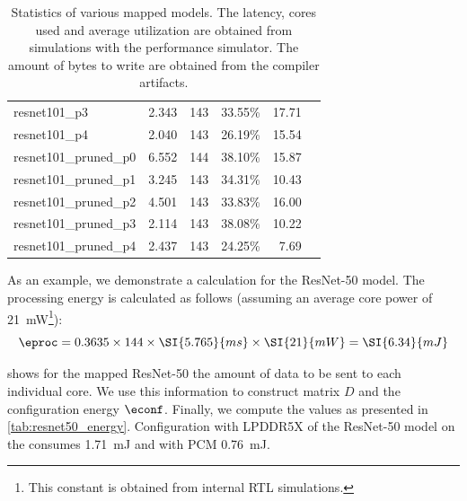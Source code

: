 \begin{table}[hbtp]
\begin{tabular}{@{}lrrrrr@{}}
resnet101\_p3           & 2.343                                                           & 143            & 33.55\%            & 17.71                                                             \\
resnet101\_p4           & 2.040                                                           & 143            & 26.19\%            & 15.54                                                             \\
resnet101\_pruned\_p0   & 6.552                                                           & 144            & 38.10\%            & 15.87                                                             \\
resnet101\_pruned\_p1   & 3.245                                                           & 143            & 34.31\%            & 10.43                                                             \\
resnet101\_pruned\_p2   & 4.501                                                           & 143            & 33.83\%            & 16.00                                                             \\
resnet101\_pruned\_p3   & 2.114                                                           & 143            & 38.08\%            & 10.22                                                             \\
resnet101\_pruned\_p4   & 2.437                                                           & 143            & 24.25\%            & 7.69                                                              \\
\bottomrule
\end{tabular}
\caption{
    Statistics of various mapped models.
    The latency, cores used and average utilization are obtained from simulations with the performance simulator.
    The amount of bytes to write are obtained from the compiler artifacts.
}
\label{tab:example_models_stats}
\end{table}

As an example, we demonstrate a calculation for the ResNet-50 model.
The processing energy is calculated as follows (assuming an average core power of \SI{21}{mW}\footnote{This constant is obtained from internal RTL simulations.}):
\begin{equation}
    \eproc = 0.3635 \times 144 \times \SI{5.765}{ms} \times \SI{21}{mW} = \SI{6.34}{mJ}
\end{equation}

 shows for the mapped ResNet-50 the amount of data to be sent to each individual core.
We use this information to construct matrix $D$ and the configuration energy $\econf$.
Finally, we compute the values as presented in \cref{tab:resnet50_energy}.
Configuration with LPDDR5X of the ResNet-50 model on the \graicore{} consumes \SI{1.71}{mJ} and with PCM \SI{0.76}{mJ}.

